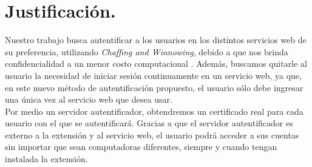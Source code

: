 \documentclass[12pt, a4paper, titlepage]{report}
\begin{document}
    	\section{Justificación.}
    	    Nuestro trabajo busca autentificar a los usuarios en los distintos servicios web de su preferencia, utilizando \textit{Chaffing and Winnowing}, debido a que nos brinda confidencialidad a un menor costo computacional \cite{refRivestSeguridad}. Además, buscamos quitarle al usuario la necesidad de iniciar sesión continuamente en un servicio web, ya que, en este nuevo método de autentificación propuesto, el usuario sólo debe ingresar una única vez al servicio web que desea usar.\\
    	    Por medio un servidor autentificador, obtendremos un certificado real para cada usuario con el que se autentificará. Gracias a que el servidor autentificador es externo a la extensión y al servicio web, el usuario podrá acceder a sus cuentas sin importar que sean computadoras diferentes, siempre y cuando tengan instalada la extensión. 
    

    	 
\end{document}
